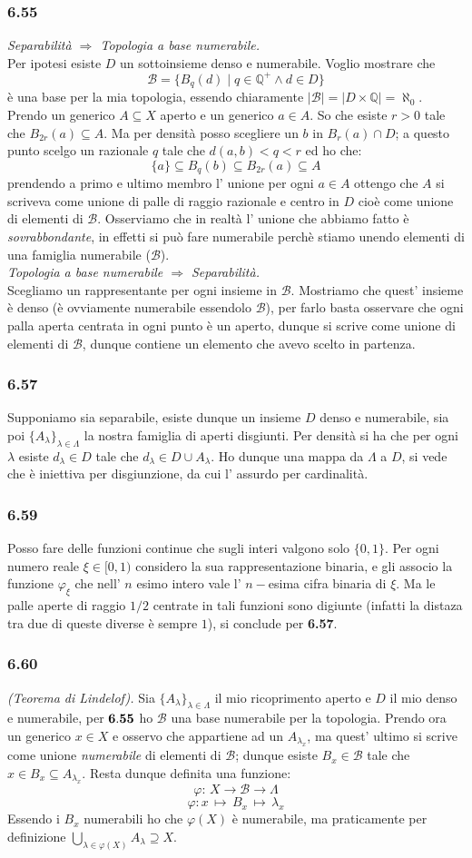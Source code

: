 \documentclass[a4paper,11pt]{article}
\newcommand{\ex}[1]{\subsubsection*{#1}}
\newcommand{\QQ}{\mathbb{Q}}
\newcommand{\cart}{\times}
\newcommand{\rec}[1]{{\bf #1}}
\newcommand{\norm}[1]{\mid{#1}\mid}
\begin{document}
\ex{6.55}{\it Separabilità $\Rightarrow$ Topologia a base numerabile.}\\
Per ipotesi esiste $D$ un sottoinsieme denso e numerabile. Voglio mostrare che
$$\mathcal{B}=\{B_q(d)\mid q\in\QQ^+ \wedge d\in D\}$$
è una base per la mia topologia, essendo chiaramente $\norm{\mathcal{B}}=\norm{D\cart \QQ}=\aleph_0$. Prendo un generico $A\subseteq X$ aperto e un generico $a\in A$. So che esiste $r>0$ tale che $B_{2r}(a)\subseteq A$. Ma per densità posso scegliere un $b$ in $B_r(a)\cap D$; a questo punto scelgo un razionale $q$ tale che $d(a,b)<q<r$ ed ho che:
$$
\{a\}\subseteq B_q(b)\subseteq B_{2r}(a)\subseteq A
$$
prendendo a primo e ultimo membro l' unione per ogni $a\in A$ ottengo che $A$ si scriveva come unione di palle di raggio razionale e centro in $D$ cioè come unione di elementi di $\mathcal{B}$. Osserviamo che in realtà l' unione che abbiamo fatto è {\it sovrabbondante}, in effetti si può fare numerabile perchè stiamo unendo elementi di una famiglia numerabile ($\mathcal{B}$).\\
{\it Topologia a base numerabile $\Rightarrow$ Separabilità.}\\
Scegliamo un rappresentante per ogni insieme in $\mathcal{B}$. Mostriamo che quest' insieme è denso (è ovviamente numerabile essendolo $\mathcal{B}$), per farlo basta osservare che ogni palla aperta centrata in ogni punto è un aperto, dunque si scrive come unione di elementi di $\mathcal{B}$, dunque contiene un elemento che avevo scelto in partenza.\\
\ex{6.57} Supponiamo sia separabile, esiste dunque un insieme $D$ denso e numerabile, sia poi $\{A_{\lambda}\}_{\lambda\in\Lambda}$ la nostra famiglia di aperti disgiunti. Per densità si ha che per ogni $\lambda$ esiste $d_{\lambda}\in D$ tale che $d_{\lambda}\in D \cup A_{\lambda}$. Ho dunque una mappa da $\Lambda$ a $D$, si vede che è iniettiva per disgiunzione, da cui l' assurdo per cardinalità.
\ex{6.59} Posso fare delle funzioni continue che sugli interi valgono solo $\{0, 1\}$. Per ogni numero reale $\xi \in[0,1)$ considero la sua rappresentazione binaria, e gli associo la funzione $\varphi _{\xi}$ che nell' $n$ esimo intero vale l' $n-$esima cifra binaria di $\xi$. Ma le palle aperte di raggio $1/2$ centrate in tali funzioni sono digiunte (infatti la distaza tra due di queste diverse è sempre $1$), si conclude per \rec{6.57}.
\ex{6.60} {\it (Teorema di Lindelof).} Sia $\{A_{\lambda}\}_{\lambda\in\Lambda}$ il mio ricoprimento aperto e $D$ il mio denso e numerabile, per $\rec{6.55}$ ho $\mathcal{B}$ una base numerabile per la topologia. Prendo ora un generico $x\in X$ e osservo che appartiene ad un $A_{\lambda_x}$, ma quest' ultimo si scrive come unione {\it numerabile} di elementi di ${\mathcal{B}}$; dunque esiste $B_x \in \mathcal{B}$ tale che $x\in B_x\subseteq A_{\lambda_x}$. Resta dunque definita una funzione:
$$
\varphi:\,  X \rightarrow \mathcal{B} \rightarrow \Lambda
$$
$$
\varphi: x\, \mapsto\, B_x\, \mapsto \, \lambda_x
$$
Essendo i $B_x$ numerabili ho che $\varphi(X)$ è numerabile, ma praticamente per definizione $\displaystyle \bigcup_{\lambda \in \varphi (X)}A_{\lambda}\supseteq X$.\\
\end{document}

